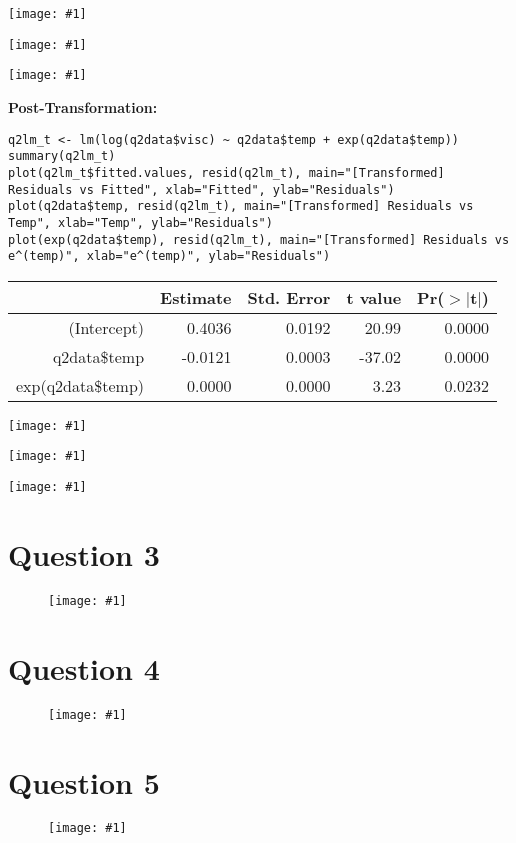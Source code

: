 \documentclass{article}
\newcommand\bsc[2][\DefaultOpt]{%
  \def\DefaultOpt{#2}%
  \section[#1]{#2}%
}
\newcommand{\simg}[1]{
  \texttt{[image: \#1]}
}
\newcommand{\wimg}[1]{
\begin{figure}[h]
  \texttt{[image: \#1]}
\end{figure}
}
\begin{document}
{{\simg{HW6Q2PC1}
\simg{HW6Q2PC2}
\simg{HW6Q2PC3}

\textbf{Post-Transformation:}

\begin{verbatim}
q2lm_t <- lm(log(q2data$visc) ~ q2data$temp + exp(q2data$temp))
summary(q2lm_t)
plot(q2lm_t$fitted.values, resid(q2lm_t), main="[Transformed] Residuals vs Fitted", xlab="Fitted", ylab="Residuals")
plot(q2data$temp, resid(q2lm_t), main="[Transformed] Residuals vs Temp", xlab="Temp", ylab="Residuals")
plot(exp(q2data$temp), resid(q2lm_t), main="[Transformed] Residuals vs e^(temp)", xlab="e^(temp)", ylab="Residuals")
\end{verbatim}

\begin{table}[ht]
\centering
\begin{tabular}{rrrrr}
  \hline
 & Estimate & Std. Error & t value & Pr($>$$|$t$|$) \\ 
  \hline
(Intercept) & 0.4036 & 0.0192 & 20.99 & 0.0000 \\ 
  q2data\$temp & -0.0121 & 0.0003 & -37.02 & 0.0000 \\ 
  exp(q2data\$temp) & 0.0000 & 0.0000 & 3.23 & 0.0232 \\ 
   \hline
\end{tabular}
\end{table}

\simg{HW6Q2PC4}
\simg{HW6Q2PC5}
\simg{HW6Q2PC6}

}

}

\bsc{Question 3}{
\wimg{HW6Q3}
}

\bsc{Question 4}{
\wimg{HW6Q4}
}
\bsc{Question 5}{
\wimg{HW6Q5}
}
\end{document}
